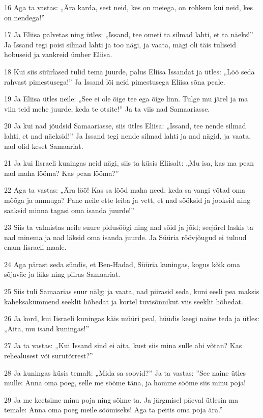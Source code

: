 \par 16 Aga ta vastas: „Ära karda, sest neid, kes on meiega, on rohkem kui neid, kes on nendega!”
\par 17 Ja Eliisa palvetas ning ütles: „Issand, tee ometi ta silmad lahti, et ta näeks!” Ja Issand tegi poisi silmad lahti ja too nägi, ja vaata, mägi oli täis tuliseid hobuseid ja vankreid ümber Eliisa.
\par 18 Kui siis süürlased tulid tema juurde, palus Eliisa Issandat ja ütles: „Löö seda rahvast pimestusega!” Ja Issand lõi neid pimestusega Eliisa sõna peale.
\par 19 Ja Eliisa ütles neile: „See ei ole õige tee ega õige linn. Tulge mu järel ja ma viin teid mehe juurde, keda te otsite!” Ja ta viis nad Samaariasse.
\par 20 Ja kui nad jõudsid Samaariasse, siis ütles Eliisa: „Issand, tee nende silmad lahti, et nad näeksid!” Ja Issand tegi nende silmad lahti ja nad nägid, ja vaata, nad olid keset Samaariat.
\par 21 Ja kui Iisraeli kuningas neid nägi, siis ta küsis Eliisalt: „Mu isa, kas ma pean nad maha lööma? Kas pean lööma?”
\par 22 Aga ta vastas: „Ära löö! Kas sa lööd maha need, keda sa vangi võtad oma mõõga ja ammuga? Pane neile ette leiba ja vett, et nad sööksid ja jooksid ning saaksid minna tagasi oma isanda juurde!”
\par 23 Siis ta valmistas neile suure pidusöögi ning nad sõid ja jõid; seejärel laskis ta nad minema ja nad läksid oma isanda juurde. Ja Süüria röövjõugud ei tulnud enam Iisraeli maale.
\par 24 Aga pärast seda sündis, et Ben-Hadad, Süüria kuningas, kogus kõik oma sõjaväe ja läks ning piiras Samaariat.
\par 25 Siis tuli Samaarias suur nälg; ja vaata, nad piirasid seda, kuni eesli pea maksis kaheksakümmend seeklit hõbedat ja kortel tuvisõnnikut viis seeklit hõbedat.
\par 26 Ja kord, kui Iisraeli kuningas käis müüri peal, hüüdis keegi naine teda ja ütles: „Aita, mu isand kuningas!”
\par 27 Ja ta vastas: „Kui Issand sind ei aita, kust siis mina sulle abi võtan? Kas rehealusest või surutõrrest?”
\par 28 Ja kuningas küsis temalt: „Mida sa soovid?” Ja ta vastas: ”See naine ütles mulle: Anna oma poeg, selle me sööme täna, ja homme sööme siis minu poja!
\par 29 Ja me keetsime minu poja ning sõime ta. Ja järgmisel päeval ütlesin ma temale: Anna oma poeg meile söömiseks! Aga ta peitis oma poja ära.”
